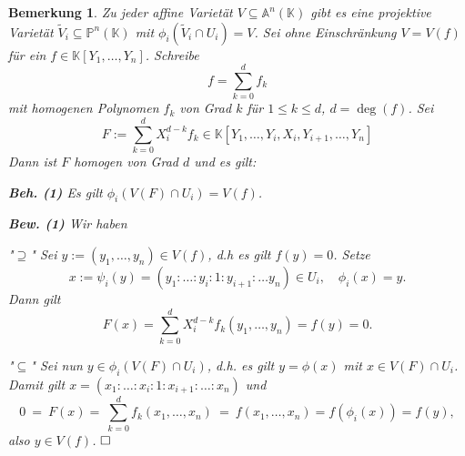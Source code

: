 \documentclass[11pt]{book}
\newtheorem{remark}[theorem]{Bemerkung}
\theoremstyle{nonumberbreak}
\newenvironment{pr}[1][]{\ifthenelse{\equal{#1}{}}{\proof}{\proof[#1]}\rm}{\endproof}
\newenvironment{definbem}[1][]{\ifthenelse{\equal{#1}{}}{\definibem}{\definibem[#1]}\rm}{\enddefinibem}
\begin{document}
\begin{spacing}{1.3}
\begin{remark}
Zu jeder affine Varietät $V \subseteq \mathbb{A}^n(\mathbb{K})$ gibt es eine projektive Varietät $\tilde{V}_i \subseteq \mathbb{P}^n(\mathbb{K})$ mit $\phi_i(\tilde{V}_i \cap U_i)=V$.
\begin{pr}
Sei ohne Einschränkung $V=V(f)$ für ein $f \in \mathbb{K}[Y_1, \ldots, Y_n]$. Schreibe
$$f = \sum_{k=0}^d f_k$$
mit homogenen Polynomen $f_k$ von Grad $k$ für $1 \leqslant k \leqslant d$, $d=\deg(f)$. Sei
$$F:= \sum_{k=0}^d X_i^{d-k} f_k \in \mathbb{K}[Y_1, \ldots, Y_i, X_i, Y_{i+1}, \ldots, Y_n]$$
Dann ist $F$ homogen von Grad $d$ und es gilt:
\begin{compactenum}
\item[\textbf{Beh. (1)}] Es gilt $\phi_i(V(F) \cap U_i) = V(f)$.
\item[\textbf{Bew. (1)}] Wir haben
\begin{compactenum}
\item["$\supseteq$"] Sei $y:=(y_1, \ldots, y_n) \in V(f)$, d.h es gilt $f(y)=0$. Setze
$$x:=\psi_i(y)=\left(y_1: \ldots : y_i : 1 : y_{i+1}: \ldots y_n \right) \in U_i, \quad \phi_i(x)=y.$$
Dann gilt
$$F(x)= \sum_{k=0}^d X_i^{d-k} f_k(y_1, \ldots, y_n) = f(y) = 0.$$
\item["$\subseteq$"] Sei nun $y \in \phi_i ( V(F) \cap U_i)$, d.h. es gilt $y= \phi(x)$ mit $x \in V(F) \cap U_i$.\\
Damit gilt $x= (x_1: \ldots : x_{i}:1:x_{i+1}: \ldots : x_n )$ und
$$0\ = \ F(x)=  \ \sum_{k=0}^d f_k(x_1, \ldots, x_n) \ = \ f(x_1, \ldots, x_n)= f(\phi_i(x)) = f(y),$$
also $y \in V(f)$. $\hfill \Box$
\end{compactenum}
\end{compactenum}
\end{pr}
\end{remark}

\begin{definbem} %


\end{definbem}
\end{spacing}
\end{document}
